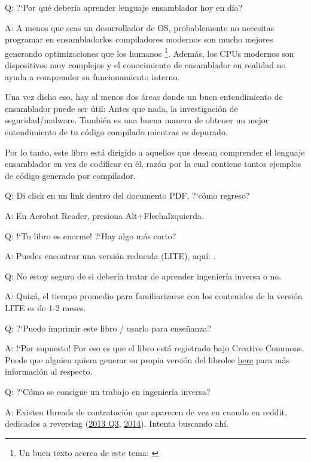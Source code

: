 \par Q: ?`Por qu\'e deber\'ia aprender lenguaje ensamblador hoy en d\'ia?
\par A: A menos que seas un desarrollador de \ac{OS}, probablemente no necesitas programar en ensamblador\textemdash{}los compiladores modernos
son mucho mejores generando optimizaciones que los humanos
\footnote{Un buen texto acerca de este tema: \cite{AgnerFog}}.
Adem\'as, los \ac{CPU}s modernos son dispositivos muy complejos y el conocimiento de ensamblador en realidad no ayuda a comprender su funcionamiento interno.

Una vez dicho eso, hay al menos dos \'areas donde un buen entendimiento de ensamblador puede ser \'util:
Antes que nada, la investigaci\'on de seguridad/malware. Tambi\'en es una buena manera de obtener un mejor entendimiento de tu c\'odigo compilado mientras es depurado.

Por lo tanto, este libro est\'a dirigido a aquellos que desean comprender el lenguaje ensamblador en vez de codificar en \'el,
raz\'on por la cual contiene tantos ejemplos de c\'odigo generado por compilador.

\par Q: Di click en un link dentro del documento PDF, ?`c\'omo regreso?
\par A: En Acrobat Reader, presiona Alt+FlechaIzquierda.

\ifx\LITE\undefined
\par Q: !`Tu libro es enorme! ?`Hay algo m\'as corto?
\par A: Puedes encontrar una versi\'on reducida (LITE), aqu\'i: \LITEURL{}.
\fi

\par Q: No estoy seguro de si deber\'ia tratar de aprender ingenier\'ia inversa o no.
\par A: Quiz\'a, el tiempo promedio para familiarizarse con los contenidos de la versi\'on LITE es de 1-2 meses.

\par Q: ?`Puedo imprimir este libro / usarlo para ense\~nanza?
\par A: !`Por supuesto! Por eso es que el libro est\'a registrado bajo Creative Commons.
Puede que alguien quiera generar su propia versi\'on del libro\textemdash{}lee \href{\HACKINGMdURL}{here} para m\'as informaci\'on al respecto.

\par Q: ?`C\'omo se consigue un trabajo en ingenier\'ia inversa?
\par A: Existen threads de contrataci\'on que aparecen de vez en cuando en reddit, dedicados a reversing\FNURLREDDIT{}
(\href{http://go.yurichev.com/17333}{2013 Q3}, 
\href{http://go.yurichev.com/17334}{2014}).
Intenta buscando ah\'i.

